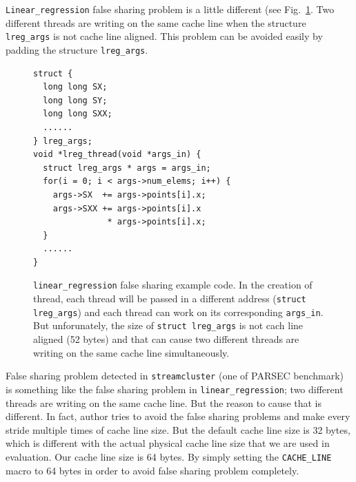 \texttt{Linear\_regression} false sharing problem is a little different (see Fig.~\ref{fig:linear_regression}. 
Two different threads are writing on the 
same cache line when the structure \texttt{lreg\_args} is not cache line aligned. This problem can
be avoided easily by padding the structure \texttt{lreg\_args}.
\begin{figure}[!t]
\begin{lstlisting}
struct {
  long long SX;
  long long SY;
  long long SXX;
  ......
} lreg_args;
void *lreg_thread(void *args_in) {
  struct lreg_args * args = args_in;
  for(i = 0; i < args->num_elems; i++) {
    args->SX  += args->points[i].x;
    args->SXX += args->points[i].x 
			   * args->points[i].x;
  }
  ......	
}
\end{lstlisting}
\caption{\texttt{linear\_regression} false sharing example code. 
In the creation of thread, each thread will be passed in a different
address (\texttt{struct lreg\_args}) and each thread can work on its corresponding \texttt{args\_in}. 
But unforunately, the size of \texttt{struct lreg\_args} is not cach line aligned (52 bytes) and that
can cause two different threads are writing on the same cache line simultaneously. 
\label{fig:linear_regression}}
\end{figure}

False sharing problem detected in \texttt{streamcluster} (one of PARSEC benchmark) is something like the false 
sharing problem in \texttt{linear\_regression}; two different threads are writing on the same cache line. 
But the reason to cause that is different. In fact, author tries to avoid the false sharing
problems and make every stride multiple times of cache line size. But the default cache line 
size is 32 bytes, which is different with the actual physical cache line size that we are used in
evaluation. Our cache line size is 64 bytes. By simply setting the \texttt{CACHE\_LINE} macro to 64 bytes in order 
to avoid false sharing problem completely. 

